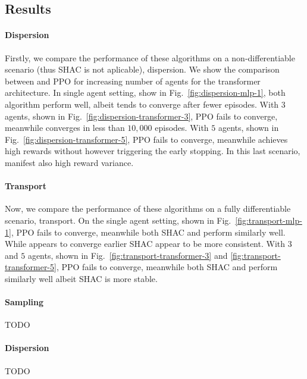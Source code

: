 \subsection{Results}

\paragraph{Dispersion}
Firstly, we compare the performance of these algorithms on a non-differentiable scenario (thus SHAC is not aplicable), dispersion. We show the comparison between \fname{} and PPO for increasing number of agents for the transformer architecture. In single agent setting, show in Fig.~\ref{fig:dispersion-mlp-1}, both algorithm perform well, albeit \fname{} tends to converge after fewer episodes. With $3$ agents, shown in Fig.~\ref{fig:dispersion-transformer-3}, PPO fails to converge, meanwhile \fname{} converges in less than $10,000$ episodes. With $5$ agents, shown in Fig.~\ref{fig:dispersion-transformer-5}, PPO fails to converge, meanwhile \fname{} achieves high rewards without however triggering the early stopping. In this last scenario, \fname{} manifest also high reward variance.

\paragraph{Transport}
Now, we compare the performance of these algorithms on a fully differentiable scenario, transport. On the single agent setting, shown in Fig.~\ref{fig:transport-mlp-1}, PPO fails to converge, meanwhile both SHAC and \fname{} perform similarly well. While \fname{} appears to converge earlier SHAC appear to be more consistent. With $3$ and $5$ agents, shown in Fig.~\ref{fig:transport-transformer-3} and \ref{fig:transport-transformer-5}, PPO fails to converge, meanwhile both SHAC and \fname{} perform similarly well albeit SHAC is more stable. 

\paragraph{Sampling}
TODO

\paragraph{Dispersion}
TODO
